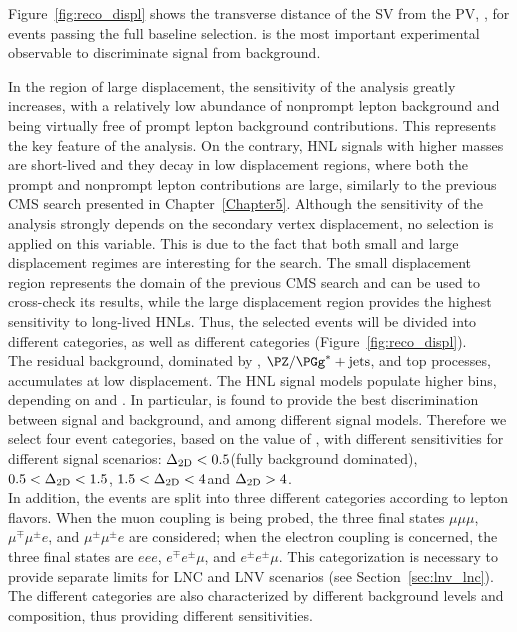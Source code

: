 Figure~\ref{fig:reco_displ} shows the transverse
distance of the SV from the PV, \Deltwod, for events
passing the full baseline selection. \Deltwod is the most important
experimental observable to discriminate signal from background.

In the region of large displacement, the sensitivity of the analysis
greatly increases, with a relatively low abundance of nonprompt lepton
background and being virtually free of prompt lepton background
contributions. This represents the key feature of the analysis.
On the contrary, HNL signals with higher masses are short-lived and
they decay in low displacement regions, where both the prompt and
nonprompt lepton contributions are large, similarly to the previous
CMS search presented in Chapter~\ref{Chapter5}.
Although the sensitivity of the analysis strongly depends on the
secondary vertex displacement, no selection is applied on this
variable. This is due to the fact that both small and large
displacement regimes are interesting for the search. The small
displacement region represents the domain of the previous CMS search
and can be used to cross-check its results, while the large
displacement region provides the highest sensitivity to long-lived
HNLs. 
Thus, the selected events will be divided into different \Deltwod
categories, as well as different \mtwol categories
(Figure~\ref{fig:reco_displ}).\\ 

The residual background, dominated by \Xg,
$\PZ/\PGg^{\ast}+\mathrm{jets}$, and top processes, accumulates at low
displacement. The HNL signal models populate higher \Deltwod bins, depending on \mhnl and \mixpar. In particular, \Deltwod
is found to provide the best discrimination between signal and
background, and among different signal models.
Therefore we select four event categories, based on the value of
\Deltwod, with different sensitivities for different signal
scenarios:
$\Delta_{\mathrm{2D}}<0.5$\cm (fully background dominated), $0.5<\Delta_{\mathrm{2D}}<1.5$\cm,
$1.5<\Delta_{\mathrm{2D}}<4$\cm and $\Delta_{\mathrm{2D}}>4$\cm.\\
In addition, the events are split into three different categories
according to lepton flavors. When the muon coupling is being probed, the three final states $\mu\mu\mu$,  $\mu^{\mp}\mu^{\pm} e$,
and $\mu^{\pm}\mu^{\pm}e$ are considered; when the electron coupling
is concerned, the three final states
are $eee$,  $e^{\mp}e^{\pm}\mu$, and $e^{\pm}e^{\pm}\mu$. This categorization
is necessary to provide separate limits for LNC 
and LNV scenarios (see Section~\ref{sec:lnv_lnc}).
The different categories are also characterized by different
background levels and composition, thus providing different
sensitivities.

